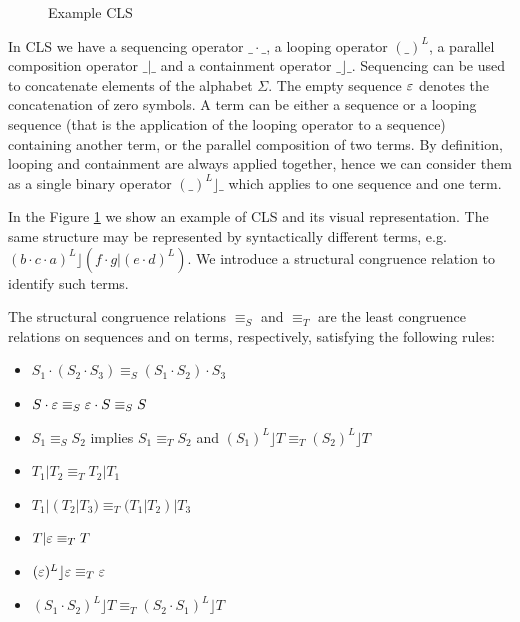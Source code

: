 \begin{figure}
  \centering
  \caption{Example CLS}
  \label{fig:example cls}
\end{figure}

In CLS we have a sequencing operator $\_\cdot\_$, a looping operator $(\_)^L$, a parallel composition operator $\_|\_$ and a containment operator $\_\rfloor\_$. Sequencing can be used to concatenate elements of the alphabet $\Sigma$. The empty sequence $\varepsilon$ denotes the concatenation of zero symbols. A term can be either a sequence or a looping sequence (that is the application of the looping operator to a sequence) containing another term, or the parallel composition of two terms. By definition, looping and containment are always applied together, hence we can consider them as a single binary operator $(\_)^L\rfloor\_$ which applies to one sequence and one term.

\begin{example}
  In the Figure \ref{fig:example cls} we show an example of CLS and its visual representation. The same structure may be represented by syntactically different terms, e.g. $(b\cdot c\cdot a)^L\rfloor (f\cdot g | (e\cdot d)^L)$. We introduce a structural congruence relation to identify such terms.
\end{example}

\begin{definition}
  The structural congruence relations $\equiv_S$ and $\equiv_T$ are the least congruence relations on sequences and on terms, respectively, satisfying the following rules:
  \begin{itemize}
    \item $S_1\cdot(S_2\cdot S_3)\equiv_S (S_1\cdot S_2)\cdot S_3$
    \item $S\cdot\varepsilon\equiv_S \varepsilon\cdot S\equiv_S S$
    \item $S_1\equiv_S S_2$ implies $S_1\equiv_T S_2$ and $(S_1)^L\rfloor T\equiv_T (S_2)^L\rfloor T$
    \item $T_1|T_2\equiv_T T_2|T_1$
    \item $T_1|(T_2|T_3)\equiv_T (T_1|T_2)|T_3$
    \item $T|\varepsilon\equiv_T T$
    \item $(\varepsilon)^L\rfloor\varepsilon\equiv_T\varepsilon$
    \item $(S_1\cdot S_2)^L\rfloor T\equiv_T (S_2\cdot S_1)^L\rfloor T$
  \end{itemize}
\end{definition}


